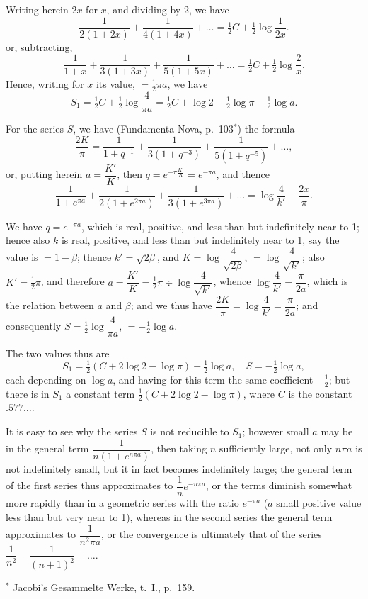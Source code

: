 \documentclass[11pt,a4paper]{article}
\begin{document}
Writing herein $2x$ for $x$, and dividing by 2, we have
\[
\frac{1}{2(1+2x)} + \frac{1}{4(1+4x)} + \ldots = \tfrac{1}{2}C + \tfrac{1}{2}\log\frac{1}{2x}.
\]
or, subtracting,
\[
\frac{1}{1+x} + \frac{1}{3(1+3x)} + \frac{1}{5(1+5x)} + \ldots = \tfrac{1}{2}C + \tfrac{1}{2}\log\frac{2}{x}.
\]
Hence, writing for $x$ its value, $= \tfrac{1}{2}\pi a$, we have
\[
S_1 = \tfrac{1}{2}C + \tfrac{1}{2}\log\frac{4}{\pi a} = \tfrac{1}{2}C + \log 2 - \tfrac{1}{2}\log\pi - \tfrac{1}{2}\log a.
\]

For the series $S$, we have (Fundamenta Nova, p.\ 103$^*$) the formula
\[
\frac{2K}{\pi} = \frac{1}{1+q^{-1}} + \frac{1}{3(1+q^{-3})} + \frac{1}{5(1+q^{-5})} + \ldots,
\]
or, putting herein $a = \dfrac{K'}{K}$, then $q = e^{-\pi\frac{K'}{K}} = e^{-\pi a}$, and thence
\[
\frac{1}{1+e^{\pi a}} + \frac{1}{2(1+e^{2\pi a})} + \frac{1}{3(1+e^{3\pi a})} + \ldots = \log\frac{4}{k'} + \frac{2x}{\pi}.
\]

We have $q = e^{-\pi a}$, which is real, positive, and less than but indefinitely near to 1; hence also $k$ is real, positive, and less than but indefinitely near to 1, say the value is $= 1 - \beta$; thence $k' = \sqrt{2\beta}$, and $K = \log\dfrac{4}{\sqrt{2\beta}}$, $= \log\dfrac{4}{\sqrt{k'}}$; also $K' = \tfrac{1}{2}\pi$, and therefore $a = \dfrac{K'}{K} = \tfrac{1}{2}\pi \div \log\dfrac{4}{\sqrt{k'}}$, whence $\log\dfrac{4}{k'} = \dfrac{\pi}{2a}$, which is the relation between $a$ and $\beta$; and we thus have $\dfrac{2K}{\pi} = \log\dfrac{4}{k'} = \dfrac{\pi}{2a}$; and consequently $S = \tfrac{1}{2}\log\dfrac{4}{\pi a}$, $= -\tfrac{1}{2}\log a$.

The two values thus are
\[
S_1 = \tfrac{1}{2}(C + 2\log 2 - \log\pi) - \tfrac{1}{2}\log a,\quad S = -\tfrac{1}{2}\log a,
\]
each depending on $\log a$, and having for this term the same coefficient $-\tfrac{1}{2}$; but there is in $S_1$ a constant term $\tfrac{1}{2}(C + 2\log 2 - \log\pi)$, where $C$ is the constant $.577\ldots$.

It is easy to see why the series $S$ is not reducible to $S_1$; however small $a$ may be in the general term $\dfrac{1}{n(1+e^{n\pi a})}$, then taking $n$ sufficiently large, not only $n\pi a$ is not indefinitely small, but it in fact becomes indefinitely large; the general term of the first series thus approximates to $\dfrac{1}{n}e^{-n\pi a}$, or the terms diminish somewhat more rapidly than in a geometric series with the ratio $e^{-\pi a}$ ($a$ small positive value less than but very near to 1), whereas in the second series the general term approximates to $\dfrac{1}{n^2\pi a}$, or the convergence is ultimately that of the series $\dfrac{1}{n^2} + \dfrac{1}{(n+1)^2} + \ldots$.

\begin{flushright}
$^*$ Jacobi's Gesammelte Werke, t.\ I., p.\ 159.
\end{flushright}
\end{document}
